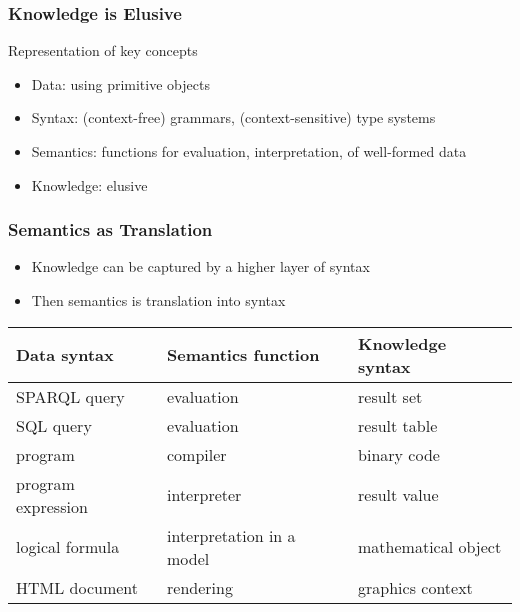 \begin{frame}\frametitle{Knowledge is Elusive}
Representation of key concepts 
\begin{itemize}
 \item Data: using primitive objects
 \item Syntax: (context-free) grammars, (context-sensitive) type systems
 \item Semantics: functions for evaluation, interpretation, of well-formed data
 \item Knowledge: elusive
\end{itemize}
\end{frame}

\begin{frame}\frametitle{Semantics as Translation}
\begin{itemize}
\item Knowledge can be captured by a higher layer of syntax
\item Then semantics is translation into syntax
\end{itemize}

\begin{center}
\begin{tabular}{l|l|l}
Data syntax & Semantics function & Knowledge syntax \\
\hline
SPARQL query & evaluation & result set \\
SQL query & evaluation & result table \\
program & compiler & binary code \\
program expression & interpreter & result value \\ 
logical formula & interpretation in a model & mathematical object \\
HTML document & rendering & graphics context
\end{tabular}
\end{center}
\end{frame}

